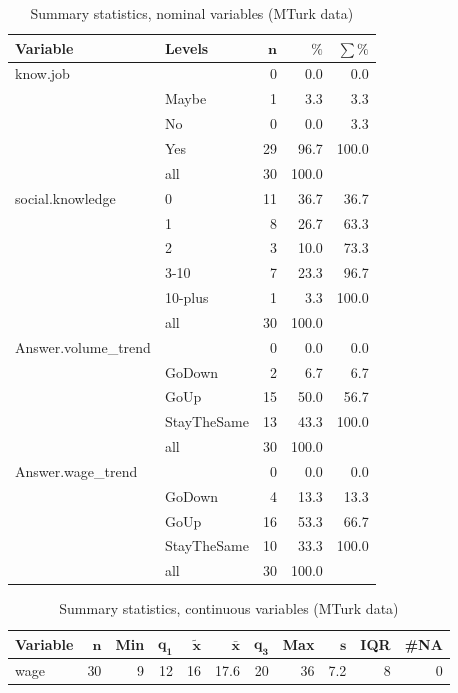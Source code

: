 \documentclass[a4paper,10pt]{article}\usepackage[]{graphicx}\usepackage[]{color}
\begin{document}
\begin{table}[ht]
\centering
{\footnotesize
\begin{tabular}{ll|rrr}
 \textbf{Variable} & \textbf{Levels} & $\mathbf{n}$ & $\mathbf{\%}$ & $\mathbf{\sum \%}$ \\ 
  \hline
know.job &  & 0 & 0.0 & 0.0 \\ 
   & Maybe & 1 & 3.3 & 3.3 \\ 
   & No & 0 & 0.0 & 3.3 \\ 
   & Yes & 29 & 96.7 & 100.0 \\ 
   \hline
 & all & 30 & 100.0 &  \\ 
   \hline
\hline
social.knowledge & 0 & 11 & 36.7 & 36.7 \\ 
   & 1 & 8 & 26.7 & 63.3 \\ 
   & 2 & 3 & 10.0 & 73.3 \\ 
   & 3-10 & 7 & 23.3 & 96.7 \\ 
   & 10-plus & 1 & 3.3 & 100.0 \\ 
   \hline
 & all & 30 & 100.0 &  \\ 
   \hline
\hline
Answer.volume\_trend &  & 0 & 0.0 & 0.0 \\ 
   & GoDown & 2 & 6.7 & 6.7 \\ 
   & GoUp & 15 & 50.0 & 56.7 \\ 
   & StayTheSame & 13 & 43.3 & 100.0 \\ 
   \hline
 & all & 30 & 100.0 &  \\ 
   \hline
\hline
Answer.wage\_trend &  & 0 & 0.0 & 0.0 \\ 
   & GoDown & 4 & 13.3 & 13.3 \\ 
   & GoUp & 16 & 53.3 & 66.7 \\ 
   & StayTheSame & 10 & 33.3 & 100.0 \\ 
   \hline
 & all & 30 & 100.0 &  \\ 
   \hline
\hline
\end{tabular}
}
\caption{Summary statistics, nominal variables (MTurk data)} 
\label{tab1:47-2060}
\end{table}
\begin{table}[ht]
\centering
{\footnotesize
\begin{tabular}{lrrrrrrrrrr}
 \textbf{Variable} & $\mathbf{n}$ & \textbf{Min} & $\mathbf{q_1}$ & $\mathbf{\widetilde{x}}$ & $\mathbf{\bar{x}}$ & $\mathbf{q_3}$ & \textbf{Max} & $\mathbf{s}$ & \textbf{IQR} & \textbf{\#NA} \\ 
  \hline
wage & 30 & 9 & 12 & 16 & 17.6 & 20 & 36 & 7.2 & 8 & 0 \\ 
  \end{tabular}
}
\caption{Summary statistics, continuous variables (MTurk data)} 
\label{tab2:47-2060}
\end{table}
\end{document}
